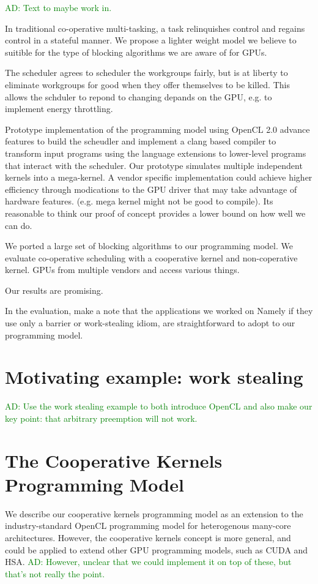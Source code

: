 \documentclass[nocopyrightspace]{sigplanconf-pldi16}
\newcommand{\ADComment}[1]{\textcolor{green}{AD: #1}}
\begin{document}
\ADComment{Text to maybe work in.}

In traditional co-operative multi-tasking, a task relinquishes control
and regains control in a stateful manner. We propose a lighter weight
model we believe to suitible for the type of blocking algorithms we
are aware of for GPUs.

The scheduler agrees to scheduler the workgroups fairly, but is at
liberty to eliminate workgroups for good when they offer themselves
to be killed. This allows the schduler to repond to changing depands
on the GPU, e.g. to implement energy throttling.

Prototype implementation of the programming model using OpenCL 2.0
advance features to build the scheudler and implement a clang based
compiler to transform input programs using the language extensions to
lower-level programs that interact with the scheduler. Our prototype
simulates multiple independent kernels into a mega-kernel. A vendor
specific implementation could achieve higher efficiency through
modications to the GPU driver that may take advantage of hardware
features. (e.g. mega kernel might not be good to compile). Its
reasonable to think our proof of concept provides a lower bound on how
well we can do.

We ported a large set of blocking algorithms to our programming
model. We evaluate co-operative scheduling with a cooperative kernel
and non-coperative kernel. GPUs from multiple vendors and access
various things.

Our results are promising.

In the evaluation, make a note that the applications we worked on
Namely if they use only a barrier or work-stealing idiom, are
straightforward to adopt to our programming model.



\section{Motivating example: work stealing}

\ADComment{Use the work stealing example to both introduce OpenCL and
  also make our key point: that arbitrary preemption will not work.}


\section{The Cooperative Kernels Programming Model}

We describe our cooperative kernels programming model as an extension
to the industry-standard OpenCL programming model for heterogenous
many-core architectures.  However, the cooperative kernels concept is
more general, and could be applied to extend other GPU programming
models, such as CUDA and HSA.  \ADComment{However, unclear that we could implement it on top of these, but that's not really the point.}
\end{document}
